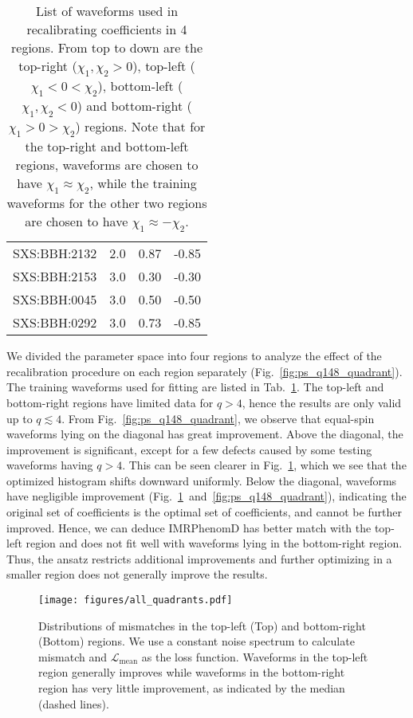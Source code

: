 \documentclass[twocolumn]{aastex631}
\begin{document}
\begin{table}[t]
\begin{tabularx}{0.8\columnwidth}{@{\extracolsep{\fill}}lrrr}
		SXS:BBH:2132 & 2.0 & 0.87     & -0.85    \\
		SXS:BBH:2153 & 3.0 & 0.30     & -0.30    \\
		SXS:BBH:0045 & 3.0 & 0.50     & -0.50    \\
		SXS:BBH:0292 & 3.0 & 0.73     & -0.85    \\ \midrule\bottomrule
	\end{tabularx}
	\caption{List of waveforms used in recalibrating coefficients in 4 regions. From top to down are the top-right ($\chi_1,\chi_2>0$), top-left ($\chi_1<0<\chi_2$), bottom-left ($\chi_1,\chi_2<0$) and bottom-right ($\chi_1>0>\chi_2$) regions. Note that for the top-right and bottom-left regions, waveforms are chosen to have $\chi_1\approx\chi_2$, while the training waveforms for the other two regions are chosen to have $\chi_1\approx-\chi_2$.}
	\label{tab:quadrants}
\end{table}

We divided the parameter space into four regions to analyze the effect of the
recalibration procedure on each region separately (Fig.~\ref{fig:ps_q148_quadrant}). 
The training waveforms used for fitting are listed in Tab.~\ref{tab:quadrants}. The
top-left and bottom-right regions have limited data for $q>4$, hence the results are
only valid up to $q\lesssim4$. From Fig.~\ref{fig:ps_q148_quadrant}, we observe that 
equal-spin waveforms lying on the diagonal has great improvement. Above the diagonal, 
the improvement is significant, except for a few defects caused by some testing waveforms 
having $q>4$. This can be seen clearer in Fig.~\ref{fig:all_quadrants}, which we see 
that the optimized histogram shifts downward uniformly. Below the diagonal, waveforms 
have negligible improvement (Fig.~\ref{fig:all_quadrants}~and~\ref{fig:ps_q148_quadrant}), 
indicating the original set of coefficients is the optimal set of coefficients, and 
cannot be further improved. Hence, we can deduce IMRPhenomD has better match with the 
top-left region and does not fit well with waveforms lying in the bottom-right 
region. Thus, the ansatz restricts additional improvements and further optimizing in a 
smaller region does not generally improve the results.

\begin{figure}[t]
	\centering
	\texttt{[image: figures/all\_quadrants.pdf]}
	\caption{Distributions of mismatches in the top-left (Top) and bottom-right (Bottom) regions.
	We use a constant noise spectrum to calculate mismatch and
	$\mathcal{L}_{\mathrm{mean}}$ as the loss function. Waveforms in the top-left region generally improves while waveforms in the bottom-right region has very little improvement, as indicated by the median (dashed lines).}
	\label{fig:all_quadrants}
\end{figure}
\end{document}
